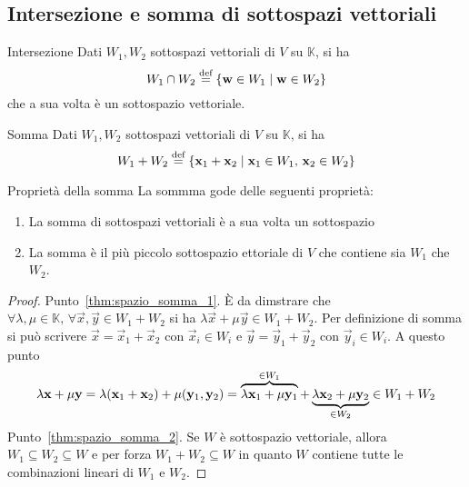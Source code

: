 \subsection{Intersezione e somma di sottospazi vettoriali}%
\label{sub:intersezione_e_somma_di_sottospazi_vettoriali}

\begin{Def}{Intersezione}
  Dati $W_1,W_2$ sottospazi vettoriali di $V$ su $\mathbb{K}$, si ha
  \begin{equation*}
    W_1\cap W_2\bydef\{\vec{w}\in W_1\Setsuchthat \vec{w}\in W_2\}
  \end{equation*}
  che a sua volta è un sottospazio vettoriale.
\end{Def}

\begin{Def}{Somma}
  Dati $W_1,W_2$ sottospazi vettoriali di $V$ su $\mathbb{K}$, si ha
  \begin{equation*}
    W_1+W_2\bydef\{\vec{x}_1+\vec{x}_2\Setsuchthat \vec{x}_1\in W_1,\,\vec{x}_2\in W_2\}
  \end{equation*}
\end{Def}

\begin{Thm}{Proprietà della somma}
  La sommma gode delle seguenti proprietà:
  \begin{enumerate}
    \item\label{thm:spazio_somma_1} La somma di sottospazi vettoriali è a sua volta un
      sottospazio
    \item\label{thm:spazio_somma_2} La somma è il più piccolo sottospazio ettoriale di
      $V$ che contiene sia $W_1$ che $W_2$.
  \end{enumerate}
\end{Thm}

\begin{proof}
  Punto~\ref{thm:spazio_somma_1}. È da dimstrare che $\forall\lambda,\mu\in\mathbb{K},\,
  \forall\vec{x},\vec{y}\in W_1+W_2$ si ha $\lambda\vec{x}+\mu\vec{y}\in W_1+W_2$. Per
  definizione di somma si può scrivere $\vec{x}=\vec{x}_1+\vec{x}_2$ con $\vec{x}_i\in
  W_i$ e $\vec{y}=\vec{y}_1+\vec{y}_2$ con $\vec{y}_i\in W_i$. A questo punto
  \begin{equation*}
    \lambda\vec{x}+\mu\vec{y}=\lambda(\vec{x}_1+\vec{x}_2)+\mu(\vec{y}_1,\vec{y}_2) =
    \overbrace{\lambda\vec{x}_1+\mu\vec{y}_1}^{\mathclap{\in
    W_1}}+\underbrace{\lambda\vec{x}_2+\mu\vec{y}_2}_{\mathclap{\in W_2}}\in W_1+W_2
  \end{equation*}
  Punto~\ref{thm:spazio_somma_2}. Se $W$ è sottospazio vettoriale, allora $W_1\subseteq
  W_2\subseteq W$ e per forza $W_1+W_2\subseteq W$ in quanto $W$ contiene tutte le
  combinazioni lineari di $W_1$ e $W_2$.
\end{proof}

